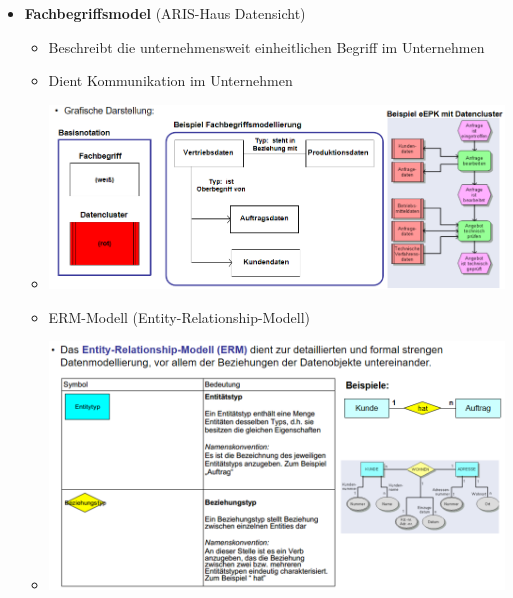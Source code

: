 \documentclass[11pt,a4paper]{article}
\begin{document}
\begin{itemize}
	\pagebreak
	
	\item \textbf{Fachbegriffsmodel} (ARIS-Haus Datensicht)
		\begin{itemize}
		\item Beschreibt die unternehmensweit einheitlichen Begriff im Unternehmen
		\item Dient Kommunikation im Unternehmen
		\item[] \includegraphics[width=15cm]{fachbegriffsmodell}
		\item ERM-Modell (Entity-Relationship-Modell)
		\item[] \includegraphics[width=15cm]{erm}
		\end{itemize}
\end{itemize}
\end{document}
